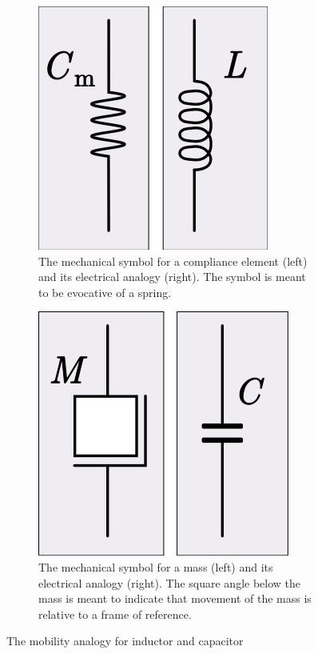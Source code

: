 \documentclass[%
 aip,
 amsmath,amssymb,
 reprint, floatfix%
]{revtex4-1}
\begin{document}
    \begin{figure}
        \centering
        \begin{subfigure}[b]{0.5\textwidth}
            \centering
            \includegraphics[scale = 0.35]{Figures/287px-Mobility_analogy_inductor.svg.png}
            \caption{The mechanical symbol for a compliance element (left) and its electrical analogy (right). The symbol is meant to be evocative of a spring.}
            \label{fig:ind}
        \end{subfigure}
        \hfill
        \begin{subfigure}[b]{0.5\textwidth}
            \centering
            \includegraphics[scale = 0.35]{Figures/313px-Mobility_analogy_capacitor.svg.png}
            \caption{The mechanical symbol for a mass (left) and its electrical analogy (right). The square angle below the mass is meant to indicate that movement of the mass is relative to a frame of reference.}
            \label{fig:cap}
        \end{subfigure}
            \caption{The mobility analogy for inductor and capacitor}
            \label{fig:analogy}
    \end{figure}
\end{document}
